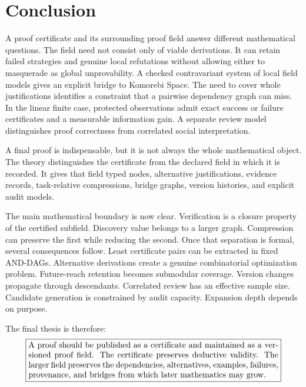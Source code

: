 \documentclass[11pt,oneside]{article}
\theoremstyle{komorebiplain}
\theoremstyle{komorebidefinition}
\theoremstyle{komorebiremark}
\begin{document}
\section{Conclusion}
\label{sec:old29}

A proof certificate and its surrounding proof field answer different mathematical questions. The field need not consist only of viable derivations. It can retain failed strategies and genuine local refutations without allowing either to masquerade as global unprovability. A checked contravariant system of local field models gives an explicit bridge to Komorebi Space. The need to cover whole justifications identifies a constraint that a pairwise dependency graph can miss. In the linear finite case, protected observations admit exact success or failure certificates and a measurable information gain. A separate review model distinguishes proof correctness from correlated social interpretation.



A final proof is indispensable, but it is not always the whole mathematical object. The theory distinguishes the certificate from the declared field in which it is recorded. It gives that field typed nodes, alternative justifications, evidence records, task-relative compressions, bridge graphs, version histories, and explicit audit models.

The main mathematical boundary is now clear. Verification is a closure property of the certified subfield. Discovery value belongs to a larger graph. Compression can preserve the first while reducing the second. Once that separation is formal, several consequences follow. Least certificate pairs can be extracted in fixed AND-DAGs. Alternative derivations create a genuine combinatorial optimization problem. Future-reach retention becomes submodular coverage. Version changes propagate through descendants. Correlated review has an effective sample size. Candidate generation is constrained by audit capacity. Expansion depth depends on purpose.

The final thesis is therefore:
\[
\boxed{\begin{minipage}{0.88\linewidth}
A proof should be published as a certificate and maintained as a versioned proof field. The certificate preserves deductive validity. The larger field preserves the dependencies, alternatives, examples, failures, provenance, and bridges from which later mathematics may grow.
\end{minipage}}
\]


\FloatBarrier
\clearpage
\appendix
{}
\end{document}
